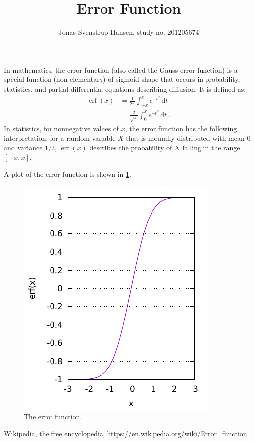 \documentclass[12pt,twocolumn]{article}
\title{Error Function}
\author{Jonas Svenstrup Hansen, study no. 201205674}
\DeclareMathOperator{\erf}{erf}
\begin{document}
\maketitle
In mathematics, the error function (also called the Gauss error function) is a special function (non-elementary) of sigmoid shape that occurs in probability, statistics, and partial differential equations describing diffusion. It is defined as:
\begin{align*}
\erf (x) &= \frac{1}{2\pi}\int_{-x}^{x} e^{-t^2} \, \text{d}t \\
&= \frac{2}{\sqrt{\pi}} \int_0^x e^{-t^2} \, \text{d}t \;.
\end{align*}
In statistics, for nonnegative values of $x$, the error function has the following interpretation: for a random variable $X$ that is normally distributed with mean $0$ and variance $1/2$, $\erf(x)$ describes the probability of $X$ falling in the range $[−x, x]$.
\cite{wiki}

A plot of the error function is shown in \cref{fig:errfunc}.
\begin{figure}
\includegraphics[width=\columnwidth]{plot.pdf}
\caption{The error function.}
\label{fig:errfunc}
\end{figure}


\begin{thebibliography}{1}
	 Wikipedia, the free encyclopedia, \url{https://en.wikipedia.org/wiki/Error_function}
\end{thebibliography}
\end{document}
